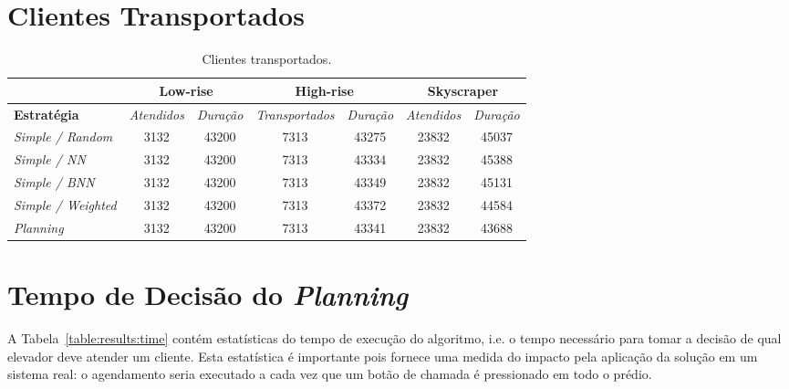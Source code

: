 \section{Clientes Transportados}

\lipsum[5]

\begin{table}[htb]
\centering
\caption{Clientes transportados.}
\label{table:results:clients}
\begin{tabular}{|l|c|c|c|c|c|c|}
\hline
\textbf{}                  & \multicolumn{2}{c|}{\textbf{Low-rise}} & \multicolumn{2}{c|}{\textbf{High-rise}} & \multicolumn{2}{c|}{\textbf{Skyscraper}} \\ \hline
\textbf{Estratégia}        & \textit{Atendidos}  & \textit{Duração} & \textit{Transportados}  & \textit{Duração}  & \textit{Atendidos}   & \textit{Duração}  \\ \hline
\textit{Simple / Random}   & 3132                & 43200            & 7313                & 43275             & 23832                & 45037             \\ \hline
\textit{Simple / NN}       & 3132                & 43200            & 7313                & 43334             & 23832                & 45388             \\ \hline
\textit{Simple / BNN}      & 3132                & 43200            & 7313                & 43349             & 23832                & 45131             \\ \hline
\textit{Simple / Weighted} & 3132                & 43200            & 7313                & 43372             & 23832                & 44584             \\ \hline
\textit{Planning}          & 3132                & 43200            & 7313                & 43341             & 23832                & 43688             \\ \hline
\end{tabular}
\end{table}

\section{Tempo de Decisão do \textit{Planning}}

A Tabela~\ref{table:results:time} contém estatísticas do tempo de execução do
algoritmo, i.e. o tempo necessário para tomar a decisão de qual elevador deve
atender um cliente. Esta estatística é importante pois fornece uma medida do
impacto pela aplicação da solução em um sistema real: o agendamento seria
executado a cada vez que um botão de chamada é pressionado em todo o prédio.

